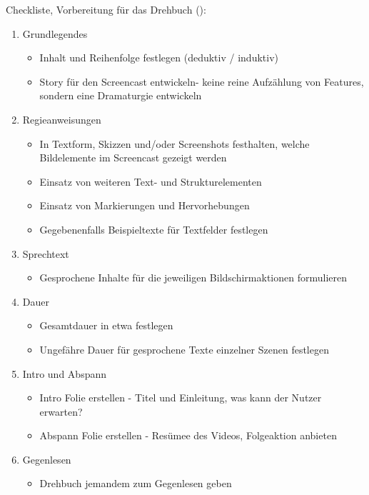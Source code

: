 Checkliste, Vorbereitung für das Drehbuch (\cite{talent}):
\begin{enumerate}
    \item Grundlegendes
    \begin{itemize}
        \item Inhalt und Reihenfolge festlegen (deduktiv / induktiv)
        \item Story für den Screencast entwickeln- keine reine Aufzählung von Features, sondern eine Dramaturgie entwickeln
    \end{itemize}
    \item Regieanweisungen
    \begin{itemize}
        \item In Textform, Skizzen und/oder Screenshots festhalten, welche Bildelemente im Screencast gezeigt werden
        \item Einsatz von weiteren Text- und Strukturelementen
        \item Einsatz von Markierungen und Hervorhebungen
        \item Gegebenenfalls Beispieltexte für Textfelder festlegen
    \end{itemize}
    \item Sprechtext
    \begin{itemize}
        \item Gesprochene Inhalte für die jeweiligen Bildschirmaktionen formulieren
    \end{itemize}
    \item Dauer
    \begin{itemize}
        \item Gesamtdauer in etwa festlegen
        \item Ungefähre Dauer für gesprochene Texte einzelner Szenen festlegen
    \end{itemize}
    \item Intro und Abspann
    \begin{itemize}
        \item Intro Folie erstellen - Titel und Einleitung, was kann der Nutzer erwarten?
        \item Abspann Folie erstellen - Resümee des Videos, Folgeaktion anbieten
    \end{itemize}
    \item Gegenlesen
    \begin{itemize}
        \item Drehbuch jemandem zum Gegenlesen geben
    \end{itemize}
\end{enumerate}
\newpage

